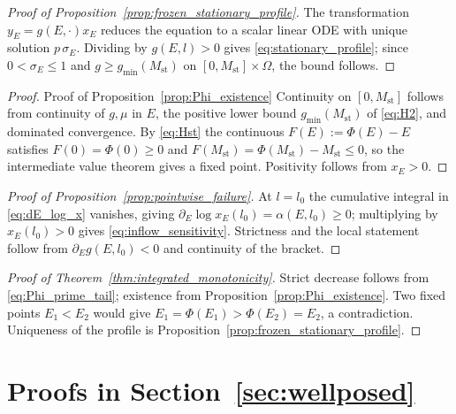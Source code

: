 \documentclass[pdflatex,sn-mathphys-num]{sn-jnl}
\newcommand{\Om}{\Omega}
\theoremstyle{plain}
\theoremstyle{definition}
\theoremstyle{remark}
\begin{document}
\begin{proof}[Proof of Proposition~\ref{prop:frozen_stationary_profile}]
The transformation $y_E=g(E,\cdot)x_E$ reduces the equation to a scalar linear
ODE with unique solution $p\,\sigma_E$. Dividing by $g(E,l)>0$ gives
\eqref{eq:stationary_profile}; since $0<\sigma_E\le1$ and
$g\ge g_{\min}(M_{\mathrm{st}})$ on $[0,M_{\mathrm{st}}]\times\Om$, the bound
follows.
\end{proof}   

\begin{proof}{Proof of Proposition~\ref{prop:Phi_existence}}
    Continuity on $[0,M_{\mathrm{st}}]$ follows from continuity of $g,\mu$ in $E$, the
positive lower bound $g_{\min}(M_{\mathrm{st}})$ of \eqref{eq:H2}, and dominated
convergence. By \eqref{eq:Hst} the continuous $F(E):=\Phi(E)-E$ satisfies
$F(0)=\Phi(0)\ge0$ and $F(M_{\mathrm{st}})=\Phi(M_{\mathrm{st}})-M_{\mathrm{st}}\le0$,
so the intermediate value theorem gives a fixed point. Positivity follows from
$x_E>0$.
\end{proof}

\begin{proof}[Proof of Proposition~\ref{prop:pointwise_failure}]
At $l=l_0$ the cumulative integral in \eqref{eq:dE_log_x} vanishes, giving
$\partial_E\log x_E(l_0)=\alpha(E,l_0)\ge0$; multiplying by $x_E(l_0)>0$ gives
\eqref{eq:inflow_sensitivity}. Strictness and the local statement follow from
$\partial_Eg(E,l_0)<0$ and continuity of the bracket.
\end{proof}

\begin{proof}[Proof of Theorem~\ref{thm:integrated_monotonicity}]
Strict decrease follows from \eqref{eq:Phi_prime_tail}; existence from
Proposition~\ref{prop:Phi_existence}. Two fixed points $E_1<E_2$ would give
$E_1=\Phi(E_1)>\Phi(E_2)=E_2$, a contradiction. Uniqueness of the profile is
Proposition~\ref{prop:frozen_stationary_profile}.
\end{proof}

\section{Proofs in Section~\ref{sec:wellposed}}
\end{document}
